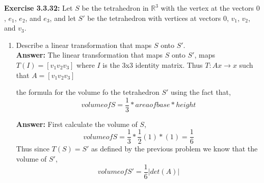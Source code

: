 \documentclass{amsart}
\def\RR{{\mathbb R}}
\begin{document}
\noindent\textbf{Exercise 3.3.32: }  Let $S$ be the tetrahedron in $\RR^{3}$ with the vertex at the vectors $0$, $e_1$, $e_2$, and $e_3$, and let $S'$ be the tetrahedron with vertices at vectors  $0$, $v_1$, $v_2$, and $v_3$.

\begin{enumerate}


\item Describe a linear transformation that maps $S$ onto $S'$.\\
\noindent \textbf{Answer: } The linear transformation that maps $S$ onto $S'$, maps $T(I) = [v_1 v_2 v_3]$ where $I$ is the 3x3 identity matrix. Thus $T: Ax \to x$ such that $A = [v_1 v_2 v_3] $
\vspace{1in}


\itemFind the formula for the volume fo the tetrahedron $S'$ using the fact that,
\begin{equation*}
volume of S = \frac{1}{3} *area of base*height
\end{equation*}

\noindent \textbf{Answer: } First calculate the volume of $S$,
 \begin{equation*}
volume of S = \frac{1}{3} *\frac{1}{2}(1)*(1) = \frac{1}{6}
\end{equation*}
Thus since $T(S) = S'$ as defined by the previous problem we know that the volume of $S'$,
\begin{equation*}
volume of S' = \frac{1}{6} |{det(A)}|
\end{equation*}

\vspace{1in}


\end{enumerate}
\end{document}
